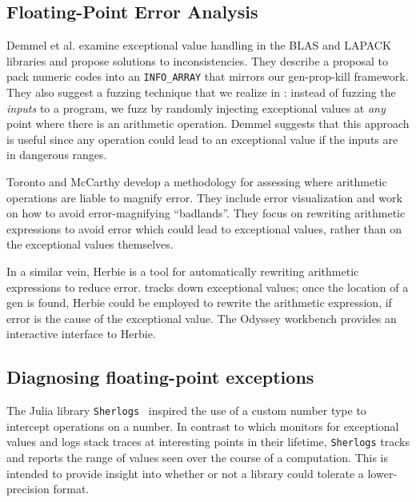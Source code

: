 \documentclass{juliacon}
\begin{document}
\subsection{Floating-Point Error Analysis}

Demmel et al.\cite{ddghlllprr-correctness-2022} examine \fp{} exceptional value handling in the BLAS and LAPACK libraries and propose solutions to inconsistencies.
They describe a proposal to pack numeric codes into an \texttt{INFO\_ARRAY} that mirrors our gen-prop-kill framework.
They also suggest a fuzzing technique that we realize in \FT{}:
instead of fuzzing the \emph{inputs} to a program, we fuzz by randomly injecting exceptional values at \emph{any} point where there is an arithmetic operation. Demmel suggests that this approach is useful since any \fp{} operation could lead to an exceptional value if the inputs are in dangerous ranges.

Toronto and McCarthy\cite{torontoPracticallyAccurateFloatingPoint2014} develop a methodology for assessing where arithmetic operations are liable to magnify \fp{} error.
They include error visualization and work on how to avoid error-magnifying ``badlands''.
They focus on rewriting arithmetic expressions to avoid error which could lead to exceptional values, rather than on the exceptional values themselves.

In a similar vein, Herbie\cite{panchekhaAutomaticallyImprovingAccuracy2015} is a tool for automatically rewriting arithmetic expressions to reduce \fp{} error.
\FT{} tracks down exceptional \fp{} values; once the location of a gen is found, Herbie could be employed to rewrite the arithmetic expression, if \fp{} error is the cause of the exceptional value.
The Odyssey\cite{misbackOdysseyInteractiveWorkbench2023} workbench provides an interactive interface to Herbie.

\subsection{Diagnosing floating-point exceptions}

The Julia library \texttt{Sherlogs}~\cite{kMilanklSherlogsJl2021} inspired the use of a custom number type to intercept operations on a number.
In contrast to \FT{} which monitors for exceptional values and logs stack traces at interesting points in their lifetime, \texttt{Sherlogs} tracks and reports the range of values seen over the course of a computation.
This is intended to provide insight into whether or not a library could tolerate a lower-precision \fp{} format.
\end{document}
